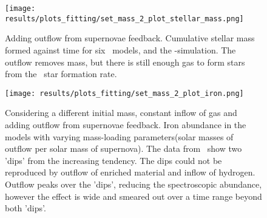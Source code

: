 \begin{figure}[h]
  \begin{minipage}[t][][t]{0.4\textwidth}
  \centering
  \texttt{[image: results/plots\_fitting/set\_mass\_2\_plot\_stellar\_mass.png]}
  \caption[Stellar mass of \fiduccialomega for with outflow mass-fitting]{
    \label{fig:fit-v1-2-stellar}
    Adding outflow from supernovae feedback.
    Cumulative stellar mass formed against time for six \omegamodel\ models, and the \eris-simulation.
    The outflow removes mass, but there is still enough gas to form stars from the \eris\ star formation rate.
  }
  \end{minipage}
  \hfill
  \begin{minipage}[t][][t]{0.4\textwidth}
    \centering
    \texttt{[image: results/plots\_fitting/set\_mass\_2\_plot\_iron.png]}
    \caption[spectroscopic iron of \fiduccialomega for with outflow mass-fitting]{
      \label{fig:fit-v1-2-iron}
    Considering a different initial mass, constant inflow of gas and adding outflow from supernovae feedback.
    Iron abundance in the models with varying mass-loading parameters(solar masses of outflow per solar mass of supernova). The data from \eris\ show two 'dips' from the increasing tendency.
    The dips could not be reproduced by outflow of enriched material and inflow of hydrogen. Outflow peaks over the 'dips', reducing the spectroscopic abundance, however the effect is wide and smeared out over a time range beyond both 'dips'.
    }
  \end{minipage}
\end{figure}
